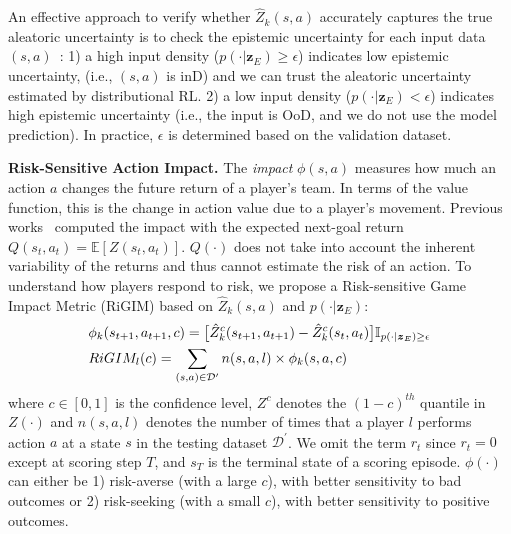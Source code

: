 \documentclass{article}
\newcommand{\condition}{\boldsymbol{z}_{E}}
\newcommand{\state}{s}
\newcommand{\action}{a}
\newcommand{\reward}{r}
\newcommand{\agentIndex}{k}
\newcommand{\dataset}{\mathcal{D}}
\newcommand{\expect}{\mathbb{E}}
\newcommand{\confidence}{c}
\newcommand{\impact}{\phi}
\newcommand{\playerId}{l}
\newcommand{\sys}{RiGIM}
\newcommand{\system}{\sys\;}
\begin{document}
An effective approach to verify whether $\hat{Z}_{\agentIndex}(\state,\action)$ accurately captures the true aleatoric uncertainty is to check the epistemic uncertainty for each input data $(\state,\action)$~\cite{Mukhoti2021Uncertainty}: 1) a high input density ($p(\cdot|\condition)\geq\epsilon$) indicates low epistemic uncertainty,
(i.e., $(\state,\action)$ is inD)
and we can trust the aleatoric uncertainty estimated by distributional RL. 2) a low input density ($p(\cdot|\condition)<\epsilon$) indicates high epistemic uncertainty (i.e., the input is OoD, and we do not use the model prediction). In practice, $\epsilon$ is determined based on the validation dataset.

\noindent\textbf{Risk-Sensitive Action Impact.}
The {\it impact} $\impact(\state,\action)$ measures how much an action $\action$ changes the future return of a player's team. In terms of the value function, this is the change in action value due to a player’s movement. 
Previous works~\cite{Routley2015Markov,Liu2018DRL,Decroos2019Actions} computed the impact with the expected next-goal return $Q(\state_{t},\action_{t})=\expect[Z(\state_{t},\action_{t})]$. $Q(\cdot)$ does not take into account the inherent variability of the returns and thus cannot estimate the risk of an action. 
To understand how players respond to risk, we propose a Risk-sensitive Game Impact Metric (\system) based on $\hat{Z}_{\agentIndex}(\state,\action)$ and $p(\cdot|\condition)$:
\begin{align}
    &\impact_{\agentIndex}(\state_{t+1},\action_{t+1},\confidence)=\big[\hat{Z}^{\confidence}_{\agentIndex}(\state_{t+1},\action_{t+1})-
    \hat{Z}^{\confidence}_{\agentIndex}(\state_{t},\action_{t})\big]\mathbb{I}_{p(\cdot|\condition)\geq\epsilon}
    \nonumber\\
    &\sys_{\playerId}(\confidence)=\sum_{(\state,\action)\in\dataset^{\prime}}n(\state,\action,\playerId)\times\impact_{\agentIndex}(\state,\action,\confidence)\label{eqn:RIGIM}
    \vspace{-0.1in}
\end{align}
where $\confidence\in[0,1]$ is the confidence level, $Z^{\confidence}$ denotes the $(1-\confidence)^{th}$ quantile in $Z(\cdot)$ and $n(\state,\action,\playerId)$ denotes the number of times that a player $\playerId$ performs action $\action$ at a state $\state$ in the testing dataset $\dataset^{\prime}$. We omit the term $\reward_t$ since $\reward_{t}=0$ except at scoring step $T$, and $\state_{T}$ is the terminal state of a scoring episode.
$\impact(\cdot)$ can either be 1) risk-averse (with a large $\confidence$), with better sensitivity to bad outcomes or 2) risk-seeking (with a small $\confidence$), with better sensitivity to positive outcomes.
\vspace{-0.05in}
\end{document}

